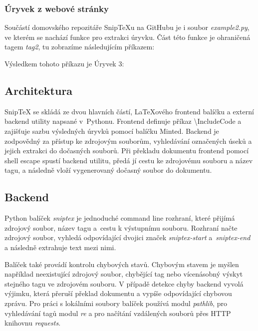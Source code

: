 \documentclass{article}
\begin{document}
\newpage

\subsubsection*{Úryvek z webové stránky}

Součástí domovského repozitáře Snip\TeX{}u na GitHubu je i soubor \textit{example2.py}, 
ve kterém se nachází funkce pro extrakci úryvku. Část této funkce je ohraničená tagem \textit{tag2}, 
tu zobrazíme následujícím příkazem:


Výsledkem tohoto příkazu je Úryvek 3:


\subsection*{Architektura}

Snip\TeX{} se skládá ze dvou hlavních částí,
La\TeX{}ového frontend balíčku a externí backend utility napsané v~Pythonu.
Frontend definuje příkaz \textbackslash{}IncludeCode a zajišťuje sazbu výsledných úryvků pomocí balíčku Minted.
Backend je zodpovědný za přístup ke zdrojovým souborům, vyhledávání označených úseků a jejich extrakci do dočasných souborů.
Při překladu dokumentu frontend pomocí shell escape spustí backend utilitu,
předá jí cestu ke zdrojovému souboru a název tagu,
a následně vloží vygenerovaný dočasný soubor do dokumentu.

\subsection*{Backend}

Python balíček \textit{sniptex} je jednoduché command line rozhraní,
které přijímá zdrojový soubor, název tagu a~cestu k výstupnímu souboru. 
Rozhraní načte zdrojový soubor, vyhledá odpovídající dvojici značek
\textit{sniptex-start} a~\textit{sniptex-end} a následně extrahuje text mezi nimi.

Balíček také provádí kontrolu chybových stavů. Chybovým stavem je myšlen například
neexistující zdrojový soubor, chybějící tag nebo vícenásobný výskyt stejného tagu ve zdrojovém souboru.
V případě detekce chyby backend vyvolá výjimku, která přeruší překlad dokumentu
a vypíše odpovídající chybovou zprávu.
Pro práci s lokálními soubory balíček používá modul \textit{pathlib},
pro vyhledávání tagů modul \textit{re}
a pro načítání vzdálených souborů přes HTTP knihovnu \textit{requests}.
\end{document}
